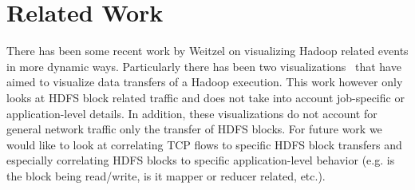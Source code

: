 \section{Related Work}
\label{sec:rw}

There has been some recent work by Weitzel on visualizing Hadoop related events in 
more dynamic ways. Particularly there has been two visualizations~\cite{HadoopViz1, HadoopViz2} that
have aimed to visualize data transfers of a Hadoop execution. This work however only looks at HDFS 
block related traffic and does not take into account job-specific or application-level details. 
In addition, these visualizations do not account for general network traffic only the transfer
of HDFS blocks. For future work we would like to look at correlating TCP flows to specific HDFS block
transfers and especially correlating HDFS blocks to specific application-level behavior (e.g. is the 
block being read/write, is it mapper or reducer related, etc.).
